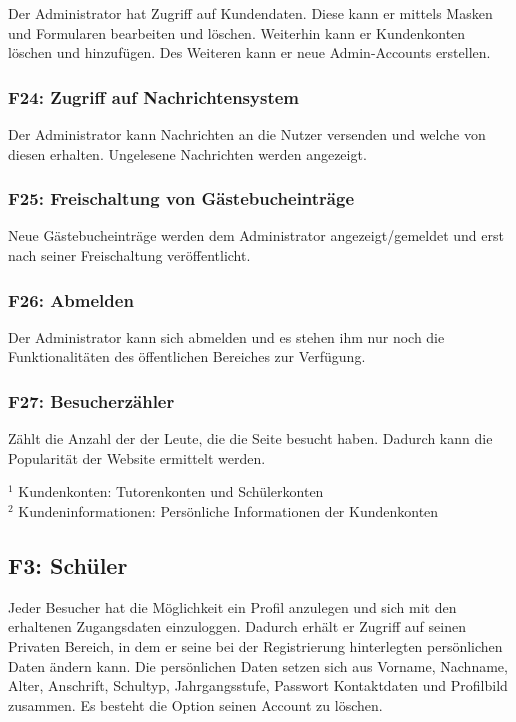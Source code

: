 \documentclass[10pt,a4paper]{scrartcl}
\begin{document}
Der Administrator hat Zugriff auf Kundendaten. Diese kann er mittels Masken und Formularen bearbeiten und löschen. Weiterhin kann er Kundenkonten löschen und hinzufügen. Des Weiteren kann er neue Admin-Accounts erstellen.

\subsubsection*{F24: Zugriff auf Nachrichtensystem}

Der Administrator kann Nachrichten an die Nutzer versenden und welche von diesen erhalten. Ungelesene Nachrichten werden angezeigt. 

\subsubsection*{F25: Freischaltung von Gästebucheinträge}

Neue Gästebucheinträge werden dem Administrator angezeigt/gemeldet und erst nach seiner Freischaltung veröffentlicht. 
	
\subsubsection*{F26: Abmelden}

Der Administrator kann sich abmelden und es stehen ihm nur noch die Funktionalitäten des öffentlichen Bereiches zur Verfügung.

\subsubsection*{F27: Besucherzähler}

Zählt die Anzahl der der Leute, die die Seite besucht haben. Dadurch kann die Popularität der Website ermittelt werden.
\bigskip

$^1$ Kundenkonten: Tutorenkonten und Schülerkonten\\
$^2$ Kundeninformationen: Persönliche Informationen der Kundenkonten




\subsection{F3: Schüler}
Jeder Besucher hat die Möglichkeit ein Profil anzulegen und sich mit den erhaltenen Zugangsdaten einzuloggen.
Dadurch erhält er Zugriff auf seinen Privaten Bereich, in dem er seine bei der Registrierung hinterlegten persönlichen Daten ändern kann.
Die persönlichen Daten setzen sich aus Vorname, Nachname, Alter, Anschrift, Schultyp, Jahrgangsstufe, Passwort Kontaktdaten und Profilbild zusammen. 
Es besteht die Option seinen Account zu löschen.
\end{document}
